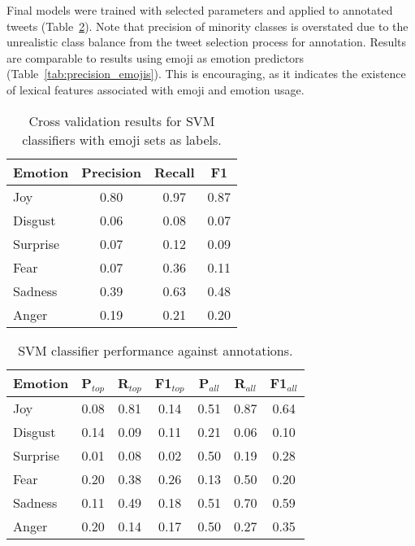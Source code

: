 \documentclass[10pt, a4paper]{article}
\begin{document}
Final models were trained with selected parameters and applied to annotated tweets (Table~\ref{tab:svm-annot-predict}). 
Note that precision of minority classes is overstated due to the unrealistic class balance from the tweet selection process for annotation.
Results are comparable to results using emoji as emotion predictors (Table~\ref{tab:precision_emojis}). 
This is encouraging, as it indicates the existence of lexical features associated with emoji and emotion usage.


\begin{table}[!ht]
\centering
\begin{tabular}{l | c | c | c}
\textbf{Emotion} & \textbf{Precision} & \textbf{Recall} &   \textbf{F1} \\
\hline
             Joy & 0.80       & 0.97   & 0.87 \\
         Disgust & 0.06       & 0.08   & 0.07 \\
        Surprise & 0.07       & 0.12   & 0.09 \\
            Fear & 0.07       & 0.36   & 0.11 \\
         Sadness & 0.39       & 0.63   & 0.48 \\
           Anger & 0.19       & 0.21   & 0.20 \\
\end{tabular}
\caption{Cross validation results for SVM classifiers with emoji sets as labels.}
\label{tab:SVM-CV-results}
\end{table}


\begin{table}[!ht]
\centering
\begin{tabular}{l | c | c | c | c | c | c}
\textbf{Emotion} & \textbf{P$_{top}$}  & \textbf{R$_{top}$} & \textbf{F1$_{top}$} & \textbf{P$_{all}$}  & \textbf{R$_{all}$} & \textbf{F1$_{all}$} \\
\hline
         Joy &   0.08  & 0.81  & 0.14  &  0.51  & 0.87  & 0.64 \\
     Disgust &   0.14  & 0.09  & 0.11  &  0.21  & 0.06  & 0.10 \\
    Surprise &   0.01  & 0.08  & 0.02  &  0.50  & 0.19  & 0.28 \\
        Fear &   0.20  & 0.38  & 0.26  &  0.13  & 0.50  & 0.20 \\
     Sadness &   0.11  & 0.49  & 0.18  &  0.51  & 0.70  & 0.59 \\
       Anger &   0.20  & 0.14  & 0.17  &  0.50  & 0.27  & 0.35 \\

\end{tabular}
\caption{SVM classifier performance against annotations. }
\label{tab:svm-annot-predict}
\end{table}
\end{document}
